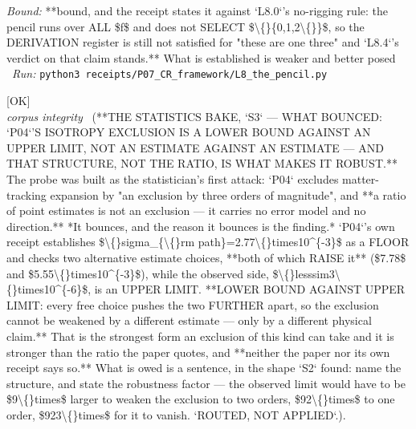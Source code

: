 \begin{description}
 \emph{Bound:} **bound, and the receipt states it against `L8.0`'s no-rigging rule: the pencil runs over ALL \$f\$ and does not SELECT \$\textbackslash\{\}\{0,1,2\textbackslash\{\}\}\$, so the DERIVATION register is still not satisfied for "these are one three" and `L8.4`'s verdict on that claim stands.** What is established is weaker and better posed
\ \emph{Run:} \texttt{python3 receipts/P07\_CR\_framework/L8\_the\_pencil.py}
\item[\label{rcpt:S3_the_exclusion_is_a_bound_against_a_bound}\texttt{S3\_the\_exclusion\_is\_a\_bound\_against\_a\_bound}]\hfill\textsf{[OK]}\\
\textit{corpus integrity} \ (**THE STATISTICS BAKE, `S3` --- WHAT BOUNCED: `P04`'S ISOTROPY EXCLUSION IS A LOWER BOUND AGAINST AN UPPER LIMIT, NOT AN ESTIMATE AGAINST AN ESTIMATE --- AND THAT STRUCTURE, NOT THE RATIO, IS WHAT MAKES IT ROBUST.** The probe was built as the statistician's first attack: `P04` excludes matter-tracking expansion by "an exclusion by three orders of magnitude", and **a ratio of point estimates is not an exclusion --- it carries no error model and no direction.** *It bounces, and the reason it bounces is the finding.* `P04`'s own receipt establishes \$\textbackslash\{\}sigma\_\{\textbackslash\{\}rm path\}=2.77\textbackslash\{\}times10\textasciicircum{}\{-3\}\$ as a FLOOR and checks two alternative estimate choices, **both of which RAISE it** (\$7.78\$ and \$5.55\textbackslash\{\}times10\textasciicircum{}\{-3\}\$), while the observed side, \$\textbackslash\{\}lesssim3\textbackslash\{\}times10\textasciicircum{}\{-6\}\$, is an UPPER LIMIT. **LOWER BOUND AGAINST UPPER LIMIT: every free choice pushes the two FURTHER apart, so the exclusion cannot be weakened by a different estimate --- only by a different physical claim.** That is the strongest form an exclusion of this kind can take and it is stronger than the ratio the paper quotes, and **neither the paper nor its own receipt says so.** What is owed is a sentence, in the shape `S2` found: name the structure, and state the robustness factor --- the observed limit would have to be \$9\textbackslash\{\}times\$ larger to weaken the exclusion to two orders, \$92\textbackslash\{\}times\$ to one order, \$923\textbackslash\{\}times\$ for it to vanish.  `ROUTED, NOT APPLIED`.). 

\end{description}

